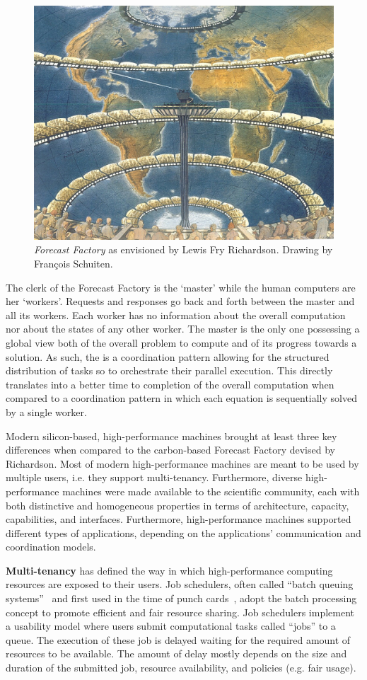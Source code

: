 \documentclass{sig-alternate}
\begin{document}
\begin{figure}[t]
  \centering
    \includegraphics[width=.45\textwidth]{figures/forecast-factory.jpg}
  \caption{\textit{Forecast Factory} as envisioned by Lewis Fry Richardson.
    Drawing by Fran{\c c}ois Schuiten.}
  \label{fig:figures_forecast-factory}
\end{figure}

The clerk of the Forecast Factory is the `master' while the human computers are
her `workers'. Requests and responses go back and forth between the master and
all its workers. Each worker has no information about the overall computation
nor about the states of any other worker. The master is the only one possessing
a global view both of the overall problem to compute and of its progress towards
a solution. As such, the {\bf \MW} is a coordination pattern allowing for the
structured distribution of tasks so to orchestrate their parallel execution.
This directly translates into a better time to completion of the overall
computation when compared to a coordination pattern in which each equation is
sequentially solved by a single worker.

Modern silicon-based, high-performance machines brought at least three key
differences when compared to the carbon-based Forecast Factory devised by
Richardson. Most of modern high-performance machines are meant to be used by
multiple users, i.e. they support multi-tenancy. Furthermore, diverse
high-performance machines were made available to the scientific community, each
with both distinctive and homogeneous properties in terms of architecture,
capacity, capabilities, and interfaces. Furthermore, high-performance machines
supported different types of applications, depending on the applications'
communication and coordination models.

{\bf Multi-tenancy} has defined the way in which high-performance computing
resources are exposed to their users. Job schedulers, often called ``batch
queuing systems''~\cite{czajkowski1998} and first used in the time of punch
cards~\cite{katz1966,silberschatz1998}, adopt the batch processing concept to
promote efficient and fair resource sharing. Job schedulers implement a
usability model where users submit computational tasks called ``jobs'' to a
queue. The execution of these job is delayed waiting for the required amount of
resources to be available. The amount of delay mostly depends on the size and
duration of the submitted job, resource availability, and policies (e.g. fair
usage).
\end{document}
